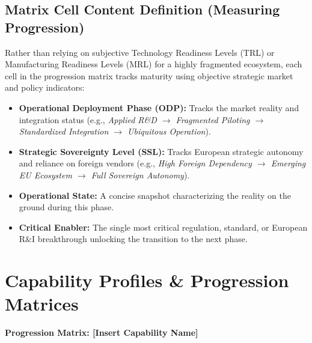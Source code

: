 \documentclass[12pt,a4paper]{article}
\begin{document}
\subsection*{Matrix Cell Content Definition (Measuring Progression)}
Rather than relying on subjective Technology Readiness Levels (TRL) or Manufacturing Readiness Levels (MRL) for a highly fragmented ecosystem, each cell in the progression matrix tracks maturity using objective strategic market and policy indicators:

\begin{itemize}
    \item \textbf{Operational Deployment Phase (ODP):} Tracks the market reality and integration status (e.g., \textit{Applied R\&D $\rightarrow$ Fragmented Piloting $\rightarrow$ Standardized Integration $\rightarrow$ Ubiquitous Operation}).
    \item \textbf{Strategic Sovereignty Level (SSL):} Tracks European strategic autonomy and reliance on foreign vendors (e.g., \textit{High Foreign Dependency $\rightarrow$ Emerging EU Ecosystem $\rightarrow$ Full Sovereign Autonomy}).
    \item \textbf{Operational State:} A concise snapshot characterizing the reality on the ground during this phase.
    \item \textbf{Critical Enabler:} The single most critical regulation, standard, or European R\&I breakthrough unlocking the transition to the next phase.
\end{itemize}


\section{Capability Profiles \& Progression Matrices}

\vspace{0.5cm}
\noindent\textbf{Progression Matrix: [Insert Capability Name]}
\vspace{0.2cm}
\end{document}
